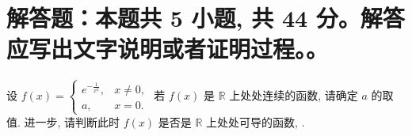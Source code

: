 




\section{解答题：本题共 5 小题, 共 44 分。解答应写出文字说明或者证明过程。。}



\begin{question}[points = 8]
设 $\displaystyle f(x) = \begin{cases}
  e^{-\frac{1}{x^2}}, & x \neq 0, \\
  a, & x = 0.
\end{cases}$ 若 $f(x)$ 是 $\mathbb{R}$ 上处处连续的函数, 请确定 $a$ 的取值. 进一步, 请判断此时 $f(x)$ 是否是 $\mathbb{R}$ 上处处可导的函数, .

\end{question}

